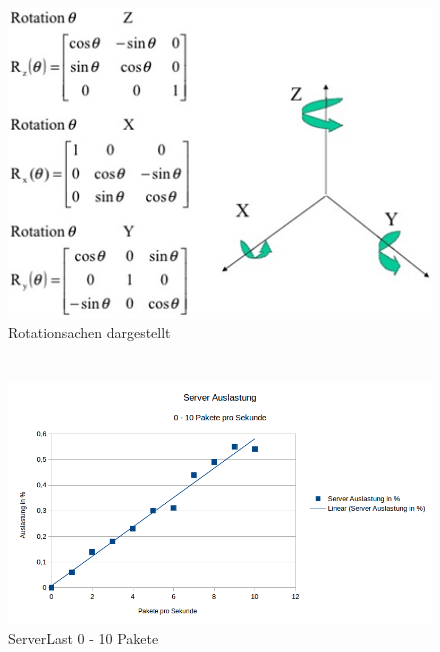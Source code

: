\documentclass[a4paper]{spie}  %
\begin{document}
\section{}
\begin{figure}[H]
	\centering
	\includegraphics[width=1\textwidth]{images/rotation}
	\caption{Rotationsachen dargestellt}
	\label{rotation}
\end{figure}

\section{}
\begin{figure}[H]
	\centering
	\includegraphics[width=1\textwidth]{images/ServerLast1.png}
	\caption{ServerLast 0 - 10 Pakete}
	\label{serverlast1}
\end{figure}
\end{document}
